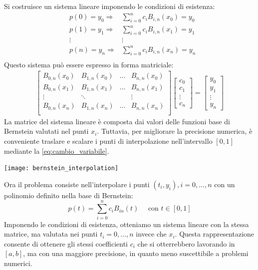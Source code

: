 \documentclass{article}
\begin{document}
Si costruisce un sistema lineare imponendo le condizioni di esistenza:
\begin{equation*}
   \begin{aligned}
       & p(0)=y_0\Rightarrow&\displaystyle\sum_{i=0}^{n}c_iB_{i,n}(x_0)=y_0\\
       & p(1)=y_1\Rightarrow&\displaystyle\sum_{i=0}^{n}c_iB_{i,n}(x_1)=y_1\\
       & \vdots & \vdots \\ 
       & p(n)=y_n\Rightarrow&\displaystyle\sum_{i=0}^{n}c_iB_{i,n}(x_n)=y_n\\
   \end{aligned} 
\end{equation*}
Questo sistema può essere espresso in forma matriciale:
\begin{equation*}
    \begin{aligned}
        \begin{bmatrix}
            B_{0,n}(x_0) & B_{1,n}(x_0) & \ldots & B_{n,n}(x_0) \\
            B_{0,n}(x_1) & B_{1,n}(x_1) & \ldots & B_{n,n}(x_1) \\
            \vdots & \ddots & & \vdots \\ 
            B_{0,n}(x_n) & B_{1,n}(x_n) & \ldots & B_{n,n}(x_n) \\
        \end{bmatrix}
        \begin{bmatrix}
            c_0 \\ 
            c_1 \\ 
            \vdots \\ 
            c_n
        \end{bmatrix}= 
        \begin{bmatrix}
           y_0\\ 
           y_1 \\ 
           \vdots \\ 
           y_n
        \end{bmatrix}
    \end{aligned}
\end{equation*}
La matrice del sistema lineare è composta dai valori delle funzioni base di
Bernstein valutati nel punti $x_i$. Tuttavia, per migliorare la precisione
numerica, è conveniente traslare e scalare i punti di interpolazione
nell'intervallo $[0,1]$ mediante la \ref{eq:cambio_variabile}. 
\begin{center}
    \texttt{[image: bernstein\_interpolation]}
\end{center}
Ora il problema consiste nell'interpolare i punti $(t_i,y_i),i=0,\ldots,n$ con
un polinomio definito nella base di Bernstein:
$$p(t)=\displaystyle\sum_{i=0}^{n}c_iB_{in}(t)\quad \text{ con }t\in[0,1]$$
Imponendo le condizioni di esistenza, otteniamo un sistema lineare con la
stessa matrice, ma valutata nei punti $t_i=0,\ldots,n$ invece che $x_i$.
Questa rappresentazione consente di ottenere gli stessi coefficienti $c_i$ che
si otterrebbero lavorando in $[a,b]$, ma con una maggiore precisione, in
quanto meno suscettibile a problemi numerici.
\end{document}
